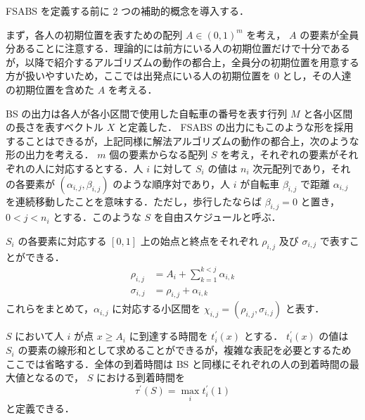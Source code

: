 FSABS を定義する前に 2 つの補助的概念を導入する．

まず，各人の初期位置を表すための配列 $A \in {(0, 1)}^{m}$ を考え， $A$ の要素が全員分あることに注意する．理論的には前方にいる人の初期位置だけで十分であるが，以降で紹介するアルゴリズムの動作の都合上，全員分の初期位置を用意する方が扱いやすいため，ここでは出発点にいる人の初期位置を 0 とし，その人達の初期位置を含めた $A$ を考える．

BS の出力は各人が各小区間で使用した自転車の番号を表す行列 $M$ と各小区間の長さを表すベクトル $X$ と定義した． FSABS の出力にもこのような形を採用することはできるが，上記同様に解法アルゴリズムの動作の都合上，次のような形の出力を考える． $m$ 個の要素からなる配列 $S$ を考え，それぞれの要素がそれぞれの人に対応するとする．人 $i$ に対して $S_i$ の値は $n_i$ 次元配列であり，それの各要素が $(\alpha_{i,j}, \beta_{i,j})$ のような順序対であり，人 $i$ が自転車 $\beta_{i,j}$ で距離 $\alpha_{i,j}$ を連続移動したことを意味する．ただし，歩行したならば $\beta_{i,j} = 0$ と置き， $0 < j < n_i$ とする．このような $S$ を自由スケジュールと呼ぶ．

$S_i$ の各要素に対応する $[0, 1]$ 上の始点と終点をそれぞれ $\rho_{i,j}$ 及び $\sigma_{i,j}$ で表すことができる．
\begin{align}
  \rho_{i,j} &= A_i + \sum_{k=1}^{k < j}\alpha_{i, k} \\
  \sigma_{i,j} &= \rho_{i,j} + \alpha_{i, k}
\end{align}
これらをまとめて，$\alpha_{i,j}$ に対応する小区間を $\chi_{i,j} = (\rho_{i,j}, \sigma_{i,j})$ と表す．

$S$ において人 $i$ が点 $x \geq A_i$ に到達する時間を $t^{\prime}_i(x)$ とする． $t^{\prime}_i(x)$ の値は $S_i$ の要素の線形和として求めることができるが，複雑な表記を必要とするためここでは省略する．全体の到着時間は BS と同様にそれぞれの人の到着時間の最大値となるので， $S$ における到着時間を
\begin{equation}
  \tau^\prime(S) = \max_i t^{\prime}_i(1)
\end{equation}
と定義できる．

